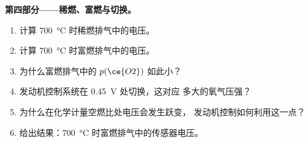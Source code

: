 \begin{problem}
\medskip\noindent\textbf{第四部分——稀燃、富燃与切换。}
\begin{enumerate}[resume]
  \item 计算 \qty{700}{\celsius} 时稀燃排气中的电压。
  \item 计算 \qty{700}{\celsius} 时富燃排气中的电压。
  \item 为什么富燃排气中的 $p(\ce{O2})$ 如此小？
  \item 发动机控制系统在 \qty{0.45}{V} 处切换，这对应
        多大的氧气压强？
  \item 为什么在化学计量空燃比处电压会发生跃变，
        发动机控制如何利用这一点？
  \item 给出结果：\qty{700}{\celsius} 时富燃排气中的传感器电压。
\end{enumerate}
\end{problem}
